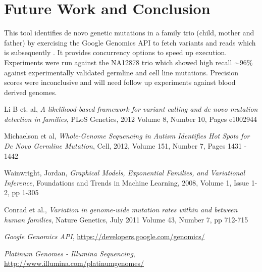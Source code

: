 \documentclass{article}
\begin{document}
\section{Future Work and Conclusion}
This tool identifies de novo genetic mutations in a family trio (child, mother and father) by exercising the Google Genomics API to fetch variants and reads which is subsequently  . It provides concurrency options to speed up execution. Experiments were run against the NA12878 trio which showed high recall $\sim 96\%$ against experimentally validated germline and cell line mutations. Precision scores were inconclusive and will need follow up experiments against blood derived genomes.


\begin{thebibliography}{10}

   Li B et. al,
   \emph{A likelihood-based framework for variant calling and de novo mutation detection in families},
   PLoS Genetics, 2012
   Volume 8, Number 10, Pages e1002944

   Michaelson et al,
   \emph{Whole-Genome Sequencing in Autism Identifies Hot Spots for De Novo Germline Mutation},  
   Cell, 2012, 
   Volume 151, Number 7, Pages 1431 - 1442

	Wainwright, Jordan,
	\emph{Graphical Models, Exponential Families, and Variational Inference},
	Foundations and Trends in Machine Learning, 2008,
	Volume 1, Issue 1-2, pp 1-305	

	Conrad et al., 
	\emph{Variation in genome-wide mutation rates within and between human families},
	Nature Genetics, July 2011
	Volume 43, Number 7, pp 712-715

	\emph{Google Genomics API},
	\url{https://developers.google.com/genomics/}

	\emph{Platinum Genomes - Illumina Sequencing},
	\url{http://www.illumina.com/platinumgenomes/}
	
\end{thebibliography}
\end{document}
